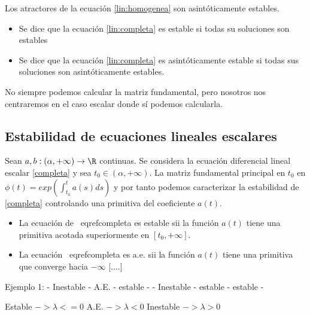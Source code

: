 \begin{ncor}
Los atractores de la ecuación \eqref{lin:homogenea} son asintóticamente estables.
\end{ncor}

\begin{ndef}
\begin{itemize}
\item Se dice que la ecuación \eqref{lin:completa} es estable si todas su soluciones son estables
\item Se dice que la ecuación \eqref{lin:completa} es asintóticamente estable si todas sus soluciones son asintóticamente estables.
\end{itemize}
\end{ndef}

No siempre podemos calcular la matriz fundamental, pero nosotros nos centraremos en el caso escalar donde sí podemos calcularla.

\subsection{Estabilidad de ecuaciones lineales escalares}
Sean $a,b:(\alpha,+\infty)\to \R$ continuas. Se considera la ecuación diferencial lineal escalar \eqref{completa} y sea $t_0\in(\alpha,+\infty)$.
La matriz fundamental principal en $t_0$ en $\phi(t)=exp(\int^t_{t_0} a(s)ds)$ y por tanto podemos caracterizar la estabilidad de \eqref{completa} controlando una primitiva del coeficiente $a(t)$.
\begin{nprop}
\begin{itemize}
\item La ecuación de \ eqref{completa} es estable sii la función $a(t)$ tiene una primitiva acotada superiormente en $[t_0,+\infty]$.
\item La ecuación \ eqref{completa} es a.e. sii la función $a(t)$ tiene una primitiva que converge hacia $-\infty$ [....]
\end{itemize}
\end{nprop}
Ejemplo 1:
- Inestable
- A.E.
- estable
-
- Inestable
- estable
- estable
-


Estable $-> \lambda <= 0$
A.E. $-> \lambda < 0$
Inestable $-> \lambda > 0$

